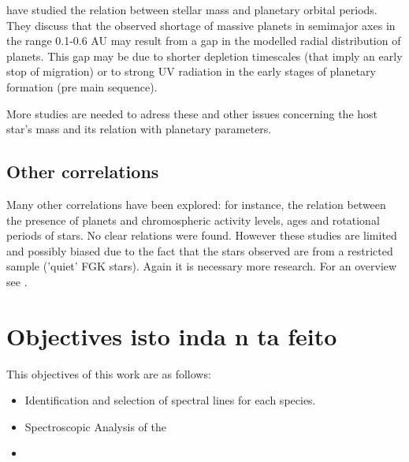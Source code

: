 \documentclass[dvips,12pt,a4paper]{report}
\begin{document}
{\citet{Burkert-2007} have studied the relation between stellar mass and planetary orbital periods. They discuss that the observed shortage of massive planets in semimajor axes in the range 0.1-0.6 AU may result from a gap in the modelled radial distribution of planets. This gap may be due to shorter depletion timescales (that imply an early stop of migration) or to strong UV radiation in the early stages of planetary formation (pre main sequence).

More studies are needed to adress these and other issues concerning the host star's mass and its relation with planetary parameters.

\subsection {Other correlations}

Many other correlations have been explored: for instance, the relation between the presence of planets and chromospheric activity levels, ages and rotational periods of stars. No clear relations were found. However these studies are limited and possibly biased due to the fact that the stars observed are from a restricted sample ('quiet' FGK stars). Again it is necessary more research. For an overview see  \citet{Udry-2007}.



\section{Objectives isto inda n ta feito}

This objectives of this work are as follows:
\begin{itemize}
\item Identification and selection of spectral lines for each species.
\item Spectroscopic Analysis of the 
\item 
\end{itemize}


}
\end{document}
